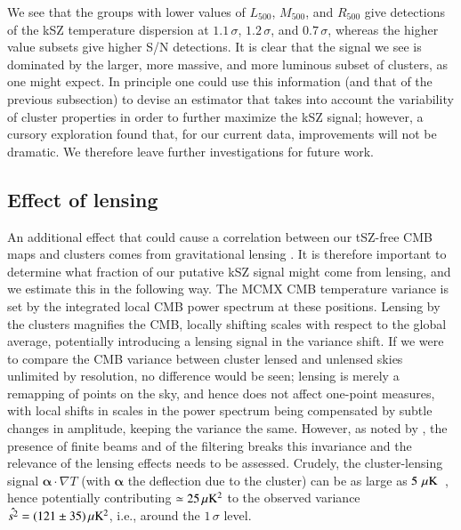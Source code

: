 \documentclass[traditabstract, longauth]{aa}
\newcommand{\1}{\'\i }
\begin{document}
We see that the groups with lower values of $L_{500}$, $M_{500}$, and
$R_{500}$ give detections of the kSZ temperature dispersion at $1.1\,\sigma$,
$1.2\,\sigma$, and $0.7\,\sigma$, whereas the higher value subsets give higher
S/N detections. It is clear that the signal we see is dominated by the
larger, more massive, and more luminous subset of clusters, as one might
expect. In principle one could use this information (and that of the previous
subsection) to devise an estimator that takes into account the variability of
cluster properties in order to further maximize the kSZ signal; however, a
cursory exploration found that, for our current data, improvements will not
be dramatic.  We therefore leave further investigations for future work.

\subsection{Effect of lensing}
\label{sec:lensing}

An additional effect that could cause a correlation between our tSZ-free CMB
maps and clusters comes from gravitational lensing
\citep[as discussed in][]{Ferraro16}.  It is therefore important to determine
what fraction of our putative kSZ signal might come from lensing, and we
estimate this in the following way.
The MCMX CMB temperature variance is set by the integrated local CMB power
spectrum at these positions. Lensing by the clusters magnifies the CMB, locally
shifting scales with respect to the global average, potentially introducing a
lensing signal in the variance shift. If we were to compare the CMB variance
between cluster lensed and unlensed skies unlimited by resolution, no
difference would be seen; lensing is merely a remapping of points on the sky,
and hence does not affect one-point measures, with local shifts in scales in
the power spectrum being compensated by subtle changes in amplitude, keeping
the variance the same. However, as noted by \cite{Ferraro16}, the presence of
finite beams and of the filtering breaks this invariance and the relevance of
the lensing effects needs to be assessed. Crudely, the cluster-lensing signal
$\boldsymbol{\alpha} \cdot \nabla T$ (with $\boldsymbol{\alpha}$ the deflection
due to the cluster) can be as large as $5\,\muK$~\citep{Lewis:2006fu},
hence potentially contributing $\simeq25\,\mu{\rm K}^2$ to the observed
variance $\hat{s^2} = (121 \pm 35)\muK^{2}$, i.e., around the $1\,\sigma$ level.
\end{document}
